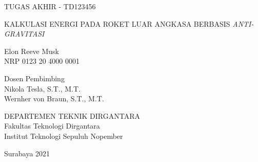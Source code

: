 TUGAS AKHIR - TD123456

\vspace{6ex}

\begin{large}
  KALKULASI ENERGI PADA ROKET LUAR ANGKASA BERBASIS \emph{ANTI-GRAVITASI}
\end{large}

\vspace{4ex}

Elon Reeve Musk \\
NRP 0123 20 4000 0001

\vspace{2ex}

Dosen Pembimbing \\
Nikola Tesla, S.T., M.T. \\
Wernher von Braun, S.T., M.T.

\vspace{6ex}

DEPARTEMEN TEKNIK DIRGANTARA \\
Fakultas Teknologi Dirgantara \\
Institut Teknologi Sepuluh Nopember

Surabaya 2021
